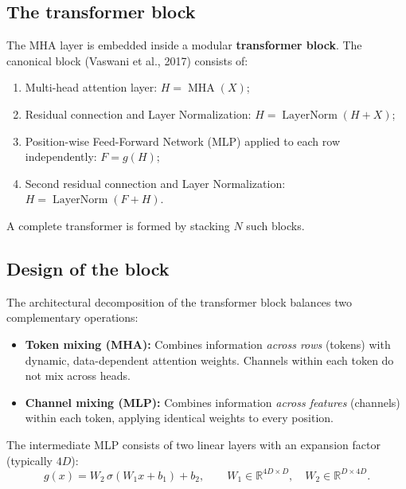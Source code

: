 \documentclass[11pt,a4paper]{article}
\newcommand{\R}{\mathbb{R}}
\DeclareMathOperator{\LN}{LayerNorm}
\DeclareMathOperator{\MHA}{MHA}
\newcommand{\slides}[1]{\par\nopagebreak\noindent{\normalfont\small\emph{(slides #1)}}\par\nopagebreak\vspace{2pt}}
\theoremstyle{definition}
\theoremstyle{plain}
\begin{document}
\subsection{The transformer block}\slides{41 / 84}
The MHA layer is embedded inside a modular \textbf{transformer block}. The canonical block (Vaswani et al., 2017) consists of:
\begin{enumerate}
\item Multi-head attention layer: $H = \MHA(X)$;
\item Residual connection and Layer Normalization: $H = \LN(H + X)$;
\item Position-wise Feed-Forward Network (MLP) applied to each row independently: $F = g(H)$;
\item Second residual connection and Layer Normalization: $H = \LN(F + H)$.
\end{enumerate}
A complete transformer is formed by stacking $N$ such blocks.

\subsection{Design of the block}\slides{42 / 84}
The architectural decomposition of the transformer block balances two complementary operations:
\begin{itemize}
\item \textbf{Token mixing (MHA):} Combines information \emph{across rows} (tokens) with dynamic, data-dependent attention weights. Channels within each token do not mix across heads.
\item \textbf{Channel mixing (MLP):} Combines information \emph{across features} (channels) within each token, applying identical weights to every position.
\end{itemize}
The intermediate MLP consists of two linear layers with an expansion factor (typically $4D$):
\begin{equation}
g(x) = W_2 \, \sigma(W_1 x + b_1) + b_2, \qquad W_1 \in \R^{4D \times D}, \quad W_2 \in \R^{D \times 4D}.
\end{equation}
\end{document}
